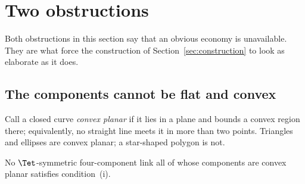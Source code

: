 %
%
%
%

\section{Two obstructions}\label{sec:obstructions}

Both obstructions in this section say that an obvious economy is unavailable.
They are what force the construction of Section~\ref{sec:construction} to look
as elaborate as it does.

\subsection{The components cannot be flat and convex}

Call a closed curve \emph{convex planar} if it lies in a plane and bounds a
convex region there; equivalently, no straight line meets it in more than two
points. Triangles and ellipses are convex planar; a star-shaped polygon is not.

\begin{theorem}\label{thm:convex}
No $\Tet$-symmetric four-component link all of whose components are convex
planar satisfies condition~(i).
\end{theorem}


